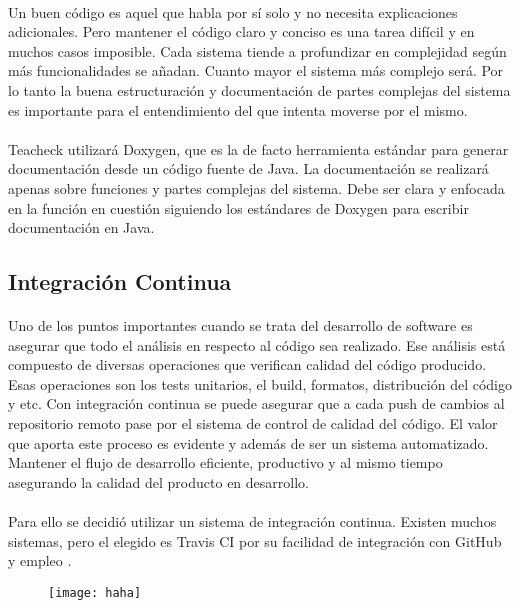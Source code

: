 \paragraph{}
Un buen código es aquel que habla por sí solo y no necesita explicaciones adicionales. Pero mantener el código claro y conciso es una tarea difícil y en muchos casos imposible. Cada sistema tiende a profundizar en complejidad según más funcionalidades se añadan. Cuanto mayor el sistema más complejo será. Por lo tanto la buena estructuración y documentación de partes complejas del sistema es importante para el entendimiento del que intenta moverse por el mismo.

\paragraph{}
Teacheck utilizará Doxygen, que es la de facto herramienta estándar para generar documentación desde un código fuente de Java. La documentación se realizará apenas sobre funciones y partes complejas del sistema. Debe ser clara y enfocada en la función en cuestión siguiendo los estándares de Doxygen para escribir documentación en Java.

\subsection{Integración Continua}
\paragraph{}
Uno de los puntos importantes cuando se trata del desarrollo de software es asegurar que todo el análisis en respecto al código sea realizado. Ese análisis está compuesto de diversas operaciones que verifican calidad del código producido. Esas operaciones son los tests unitarios, el build, formatos, distribución del código y etc. Con integración continua se puede asegurar que a cada push de cambios al repositorio remoto pase por el sistema de control de calidad del código. El valor que aporta este proceso es evidente y además de ser un sistema automatizado. Mantener el flujo de desarrollo eficiente, productivo y al mismo tiempo asegurando la calidad del producto en desarrollo.

\paragraph{}
Para ello se decidió utilizar un sistema de integración continua. Existen muchos sistemas, pero el elegido es Travis CI por su facilidad de integración con GitHub y empleo
.
\begin{figure}
  \texttt{[image: haha]}
\end{figure}
